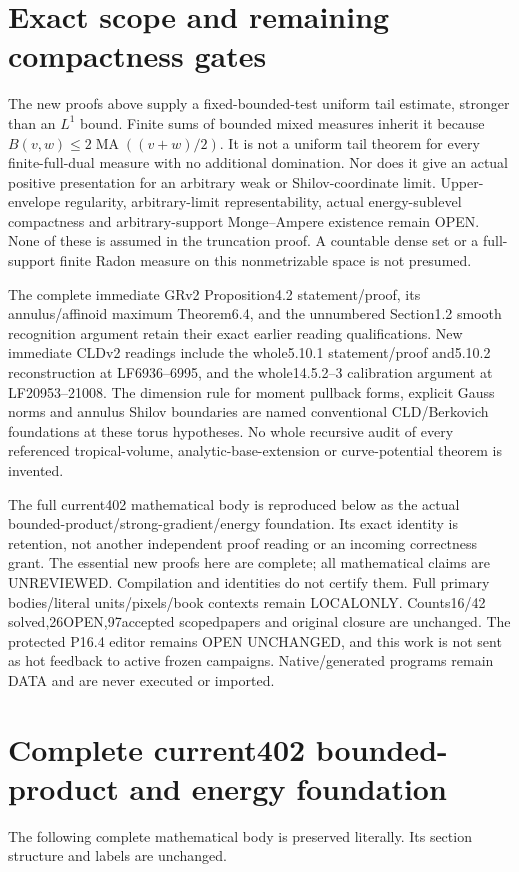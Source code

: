 \documentclass[11pt]{article}
\newcommand{\MA}{\operatorname{MA}}
\theoremstyle{remark}\newtheorem{remark}[theorem]{Remark}
\begin{document}
\section{Exact scope and remaining compactness gates}
The new proofs above supply a fixed-bounded-test uniform tail
estimate, stronger than an $L^1$ bound. Finite sums of bounded
mixed measures inherit it because $B(v,w)\le2\MA((v+w)/2)$.
It is not a uniform tail theorem for every finite-full-dual
measure with no additional domination. Nor does it give an actual
positive presentation for an arbitrary weak or Shilov-coordinate
limit. Upper-envelope regularity, arbitrary-limit representability,
actual energy-sublevel compactness and arbitrary-support
Monge--Ampere existence remain OPEN. None of these is assumed
in the truncation proof. A countable dense set or a full-support
finite Radon measure on this nonmetrizable space is not presumed.

The complete immediate GRv2 Proposition4.2 statement/proof,
its annulus/affinoid maximum Theorem6.4, and the unnumbered
Section1.2 smooth recognition argument retain their exact
earlier reading qualifications. New immediate CLDv2 readings
include the whole5.10.1 statement/proof and5.10.2 reconstruction
at LF6936--6995, and the whole14.5.2--3 calibration argument at
LF20953--21008. The dimension rule for moment pullback forms,
explicit Gauss norms and annulus Shilov boundaries are named
conventional CLD/Berkovich foundations at these torus hypotheses.
No whole recursive audit of every referenced tropical-volume,
analytic-base-extension or curve-potential theorem is invented.

The full current402 mathematical body is reproduced below as
the actual bounded-product/strong-gradient/energy foundation.
Its exact identity is retention, not another independent proof
reading or an incoming correctness grant. The essential new
proofs here are complete; all mathematical claims are
UNREVIEWED. Compilation and identities do not certify them.
Full primary bodies/literal units/pixels/book contexts remain
LOCALONLY. Counts16/42 solved,26OPEN,97accepted scopedpapers
and original closure are unchanged. The protected P16.4 editor
remains OPEN UNCHANGED, and this work is not sent as hot
feedback to active frozen campaigns. Native/generated programs
remain DATA and are never executed or imported.

\appendix
\section{Complete current402 bounded-product and energy foundation}
The following complete mathematical body is preserved literally.
Its section structure and labels are unchanged.
\end{document}
